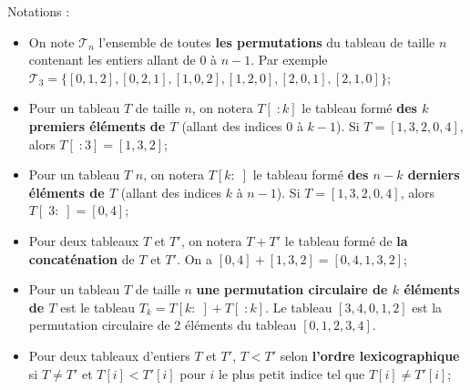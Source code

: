 \documentclass{article}
\theoremstyle{exostyle}
\theoremstyle{partiestyle}
\theoremstyle{questionstyle}
\begin{document}
\vspace*{1cm}
Notations :
\begin{itemize}
    \item On note $\mathcal{T}_n$ l'ensemble de toutes {\bf les permutations} du tableau de taille $n$ contenant les entiers allant de $0$ à $n-1$. Par exemple $\mathcal{T}_3 = \{[0, 1, 2], [0, 2, 1], [1, 0, 2], [1, 2, 0], [2, 0, 1], [2, 1, 0]\}$;
    \item Pour un tableau $T$ de taille $n$, on notera $T[\;:k]$ le tableau formé {\bf des $k$ premiers éléments de $T$} (allant des indices 0 à $k-1$). Si $T=[1, 3, 2, 0, 4]$, alors $T[\;:3] = [1, 3, 2]$;
    \item Pour un tableau $T$ $n$, on notera $T[k:\;]$ le tableau formé {\bf des $n-k$ derniers éléments de $T$} (allant des indices $k$ à $n-1$). Si $T=[1, 3, 2, 0, 4]$, alors $T[\;3:\;] = [0, 4]$;
    \item Pour deux tableaux $T$ et $T'$, on notera $T + T'$ le tableau formé de {\bf la concaténation} de $T$ et $T'$. On a $[0, 4] + [1, 3, 2] = [0, 4, 1, 3, 2]$;
    \item Pour un tableau $T$ de taille $n$ {\bf une permutation circulaire de $k$ éléments de $T$} est le tableau $T_k = T[k:\;] + T[\;:k]$. Le tableau $[3, 4, 0, 1, 2]$ est la permutation circulaire de 2 éléments du tableau $[0, 1, 2, 3, 4]$.
    \item Pour deux tableaux d'entiers $T$ et $T'$, $T < T'$ selon {\bf l'ordre lexicographique} si $T \neq T'$ et $T[i] < T'[i]$ pour $i$ le plus petit indice tel que $T[i] \neq T'[i]$;
\end{itemize}

\clearpage
\end{document}
